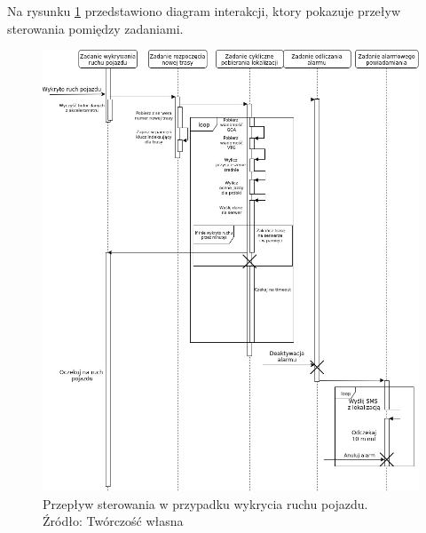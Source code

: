 Na rysunku \ref{fig:image_soft_mainboard_control_flow} przedstawiono diagram interakcji, ktory pokazuje przeływ sterowania pomiędzy zadaniami. 



\begin{figure}[H]
	\centering
	\includegraphics[width=17cm]{img/software/mainboard/MainBoardStartTracking.jpg}
	\caption{Przepływ sterowania w przypadku wykrycia ruchu pojazdu. 
	\\Źródło: Twórczość własna}
	\label{fig:image_soft_mainboard_control_flow}
\end{figure}